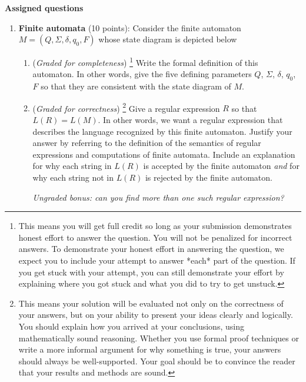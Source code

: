 \documentclass[12pt, oneside]{article}
\newcommand{\gradeCorrect}{({\it Graded for correctness}) }
\newcommand{\gradeCorrectFirst}{\gradeCorrect\footnote{This means your solution 
will be evaluated not only on the correctness of your answers, but on your ability
to present your ideas clearly and logically. You should explain how you 
arrived at your conclusions, using
mathematically sound reasoning. Whether you use formal proof techniques or 
write a more informal argument
for why something is true, your answers should always be well-supported. 
Your goal should be to convince the
reader that your results and methods are sound.} }
\newcommand{\gradeComplete}{({\it Graded for completeness}) }
\newcommand{\gradeCompleteFirst}{\gradeComplete\footnote{This means you will 
get full credit so long as your submission demonstrates honest effort to 
answer the question. You will not be penalized for incorrect answers. 
To demonstrate your honest effort in answering the question, we 
expect you to include your attempt to answer *each* part of the question. 
If you get stuck with your attempt, you can still demonstrate 
your effort by explaining where you got stuck and what 
you did to try to get unstuck.} }
\begin{document}
{\bf Assigned questions}
\begin{enumerate}[wide, labelwidth=!, labelindent=0pt]
\item\textbf{Finite automata} (10 points):
Consider the finite automaton $M = (Q, \Sigma, \delta, q_0, F)$ whose state diagram is depicted below
\begin{center}
\end{center}
    \begin{enumerate}
    \item\gradeCompleteFirst Write the formal definition of this automaton. In other words, give the five defining parameters $Q$, $\Sigma$, $\delta$, $q_0$, $F$ so that they are consistent with the state diagram of $M$.

    \item\gradeCorrectFirst Give a regular expression $R$ so that $L(R) = L(M)$. In other words, we want a regular expression that describes the language 
    recognized by this finite automaton. Justify your answer by referring to the 
    definition of the semantics of regular expressions and computations of finite automata. 
    Include an explanation for why each string in $L(R)$ is accepted by the finite automaton {\it and}
    for why each string not in $L(R)$ is rejected by the finite automaton.

    {\it Ungraded bonus: can you find more than one such regular expression?}


\end{enumerate}
\end{enumerate}
\end{document}
